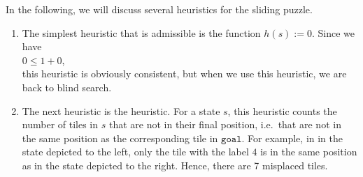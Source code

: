 \examples
In the following, we will discuss several heuristics for the sliding puzzle.
\begin{enumerate}
\item The simplest heuristic that is admissible is the function $h(s) := 0$.  Since we have
      \\[0.2cm]
      \hspace*{1.3cm}
      $0 \leq 1 + 0$,
      \\[0.2cm]
      this heuristic is obviously consistent, but when we use this heuristic, we are back to blind search.
\item The next heuristic is the  heuristic.  For a state $s$,
      this heuristic counts the number of tiles in $s$ that are not in their final position, i.e.~that are not
      in the same position as the corresponding tile in $\texttt{goal}$.  For example, in 
      in the state depicted to the left, only the tile with the label $4$ is in the same
      position as in the state depicted to the right.  Hence, there are 7 misplaced tiles.


\end{enumerate}
